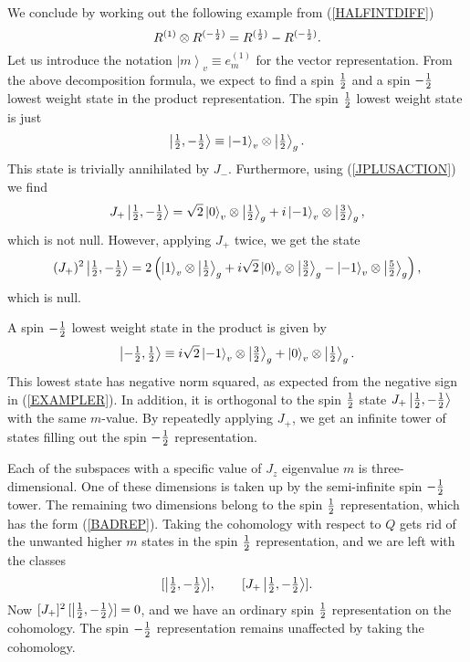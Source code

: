 \documentclass[a4paper,dvips,12pt]{article}
\newcommand {\half} {{1 \over 2}}
\newcommand {\hhalf} {{\textstyle{1 \over 2}}}
\newcommand {\ket}[1] {\left| #1 \right>}
\begin{document}
    We conclude by working out the following example from (\ref{HALFINTDIFF})
    \begin{equation}
        R^{(1)}\otimes R^{(-\half)} = R^{(\half)} - R^{(-\half)}.
        \label{EXAMPLER}
    \end{equation}
    Let us introduce the notation $\ket{m}_v \equiv e^{(1)}_m$ for the
    vector representation.
    From the above decomposition formula,
    we expect to find a spin $\half$ and a spin $-\half$
    lowest weight state in the product representation.  The spin
    $\half$ lowest weight state is just
    \[
        \ket{\hhalf, \textstyle{-\half}} \equiv \ket{-1}_v\otimes\ket{\hhalf}_g.
    \]
    This state is trivially annihilated by $J_-$.  Furthermore,
    using (\ref{JPLUSACTION}) we find
    \[
        J_+\ket{\hhalf, \textstyle{-\half}} = \sqrt 2\ket{0}_v
        \otimes\ket{\hhalf}_g + i \ket{-1}_v\otimes\ket{\textstyle{{3\over 2}}}_g,
    \]
    which is not null.  However, applying $J_+$ twice, we get the
    state
    \[
      (J_+)^2\ket{\hhalf, \textstyle{-\half}} = 2 \left(
        \ket{1}_v\otimes\ket{\hhalf}_g + i \sqrt{2}
        \ket{0}_v\otimes\ket{\textstyle{{3\over 2}}}_g -
        \ket{-1}_v\otimes\ket{\textstyle{{5\over 2}}}_g
      \right),
    \]
    which is null.

    A spin $-\half$ lowest weight state in the product is given by
    \[
        \ket{\textstyle{-\half}, \hhalf} \equiv i \sqrt 2 \ket{-1}_v
        \otimes\ket{\textstyle{{3\over 2}}}_g + \ket{0}_v\otimes
        \ket{\hhalf}_g.
    \]
    This lowest state has negative norm squared, as expected from
    the negative sign in (\ref{EXAMPLER}).  In addition, it is
    orthogonal to the spin $\half$ state $J_+\ket{\half, -\half}$
    with the same $m$-value.  By repeatedly applying $J_+$, we get
    an infinite tower of states filling out the spin $-\half$
    representation.

    Each of the subspaces with a specific value of $J_z$
    eigenvalue $m$ is three-dimensional.  One of these dimensions
    is taken up by the semi-infinite spin $-\half$ tower.  The
    remaining two dimensions belong to the spin $\half$
    representation, which has the form (\ref{BADREP}).  Taking the
    cohomology with respect to $Q$ gets rid of the unwanted
    higher $m$ states in the spin $\half$ representation, and we
    are left with the classes
    \[
        [\ket{\hhalf, \textstyle{-\half}}], \qquad [J_+\ket{\hhalf, \textstyle{-\half}}].
    \]
    Now $[J_+]^2 \,[\ket{\half, -\half}] = 0$, and we have an
    ordinary spin $\half$ representation on the cohomology.  The
    spin $-\half$ representation remains unaffected by taking the
    cohomology.
\end{document}
